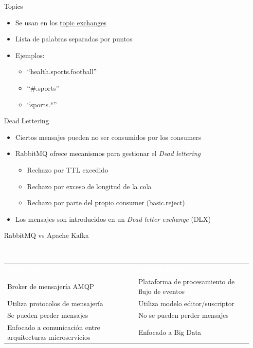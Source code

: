 \documentclass{beamer}
\begin{document}
  \begin{frame}{Topics}
    \begin{itemize}
      \item Se usan en los \underline{topic exchanges}
      \item Lista de palabras separadas por puntos
      \item Ejemplos:
      \begin{itemize}
        \item ``health.sports.football''
        \item ``\#.sports''
        \item ``sports.*''
      \end{itemize}
    \end{itemize}
  \end{frame}

  \begin{frame}{Dead Lettering}
    \begin{itemize}
      \item Ciertos mensajes pueden no ser consumidos por los consumers
      \item RabbitMQ ofrece mecanismos para gestionar el \textit{Dead lettering}
      \begin{itemize}
        \item Rechazo por TTL excedido
        \item Rechazo por exceso de longitud de la cola
        \item Rechazo por parte del propio consumer (basic.reject)
      \end{itemize}
      \item Los mensajes son introducidos en un \textit{Dead letter exchange} (DLX)
    \end{itemize}
  \end{frame}

  \begin{frame}{RabbitMQ vs Apache Kafka}
    \begin{block}{~\vspace{0.7cm}}
      \begin{center}
      \vspace{-0.65cm}
      \begin{tabular}{p{}|p{}}
        \textcolor{white}{\bf RabbitMQ} & \textcolor{white}{\bf Apache Kafka} \\
        Broker de mensajería AMQP & Plataforma de procesamiento de flujo de eventos\\ \hline
        Utiliza protocolos de mensajería & Utiliza modelo editor/suscriptor \\ \hline
        Se pueden perder mensajes & No se pueden perder mensajes \\ \hline
        Enfocado a comunicación entre arquitecturas microservicios & Enfocado a Big Data
      \end{tabular}
      \end{center}
    \end{block}
  \end{frame}
\end{document}
